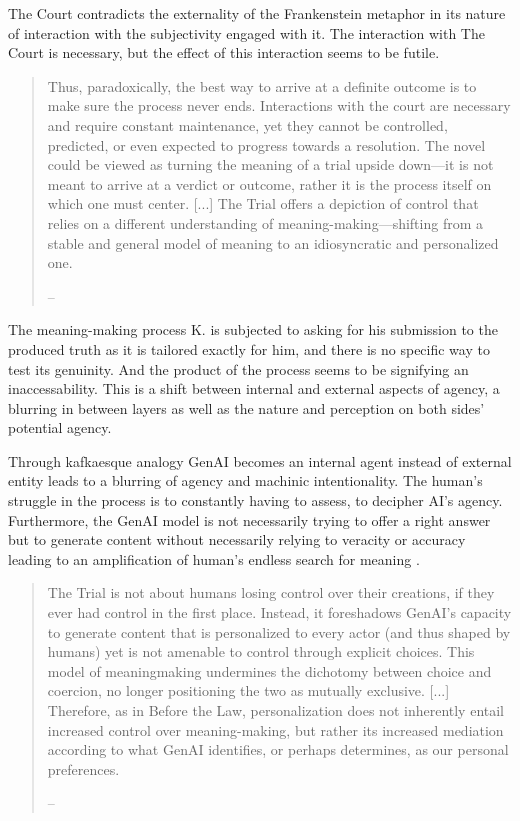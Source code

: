 The Court contradicts the externality of the Frankenstein metaphor in its
nature of interaction with the subjectivity engaged with it. The interaction
with The Court is necessary, but the effect of this interaction seems to be
futile.

\begin{quote}
	Thus, paradoxically, the best way to arrive at a definite outcome is to make sure the process never ends. Interactions with the court are necessary and require constant maintenance, yet they cannot be controlled, predicted, or even expected to progress towards a resolution. The novel could be viewed as turning the meaning of a trial upside down—it is not meant to arrive at a verdict or outcome, rather it is the process itself on which one must center. [...] The Trial offers a depiction of control that relies on a different understanding of meaning-making—shifting from a stable and general model of meaning to an idiosyncratic and personalized one.

	-- \textcite[970-972]{dishon2024}
\end{quote}

The meaning-making process K. is subjected to asking for his submission to the
produced truth as it is tailored exactly for him, and there is no specific way
to test its genuinity. And the product of the process seems to be signifying an
inaccessability. This is a shift between internal and external aspects of
agency, a blurring in between layers as well as the nature and perception on
both sides' potential agency.

Through kafkaesque analogy
GenAI becomes an internal agent instead of external entity leads to a blurring
of agency and machinic intentionality. The human's struggle in the process is
to constantly having to assess, to decipher AI's agency. Furthermore, the GenAI
model is not necessarily trying to offer a right answer but to generate content
without necessarily relying to veracity or accuracy leading to an amplification
of human's endless search for meaning \parencite[see
	977]{dishon2024}.

\begin{quote}
	The Trial is not about humans losing control over their creations, if they ever had control in the first place. Instead, it foreshadows GenAI’s capacity to generate content that is personalized to every actor (and thus shaped by humans) yet is not amenable to control through explicit choices. This model of meaningmaking undermines the dichotomy between choice and coercion, no longer positioning the two as mutually exclusive. [...] Therefore, as in Before the Law, personalization does not inherently entail increased control over meaning-making, but rather its increased mediation according to what GenAI identifies, or perhaps determines, as our personal preferences.

	-- \textcite[974]{dishon2024}
\end{quote}

